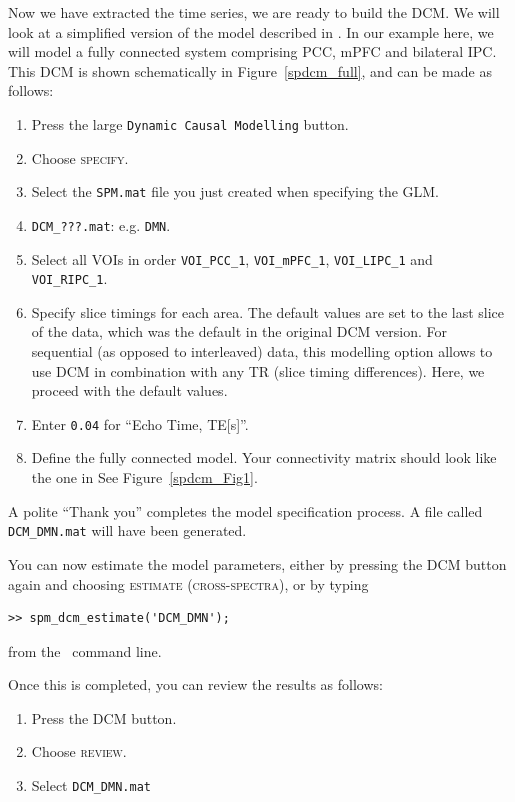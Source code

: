 Now we have extracted the time series, we are ready to build the DCM. We will look at a simplified version of the model described in \cite{rsDCM2015}.  In our example here, we will model a fully connected system comprising PCC, mPFC and bilateral IPC. This DCM is shown schematically in Figure~\ref{spdcm_full}, and can be made as follows:
\begin{enumerate}
 \item Press the large \texttt{Dynamic Causal Modelling} button.
 \item Choose \textsc{specify}.
 \item Select the \texttt{SPM.mat} file you just created when specifying the GLM.
 \item \texttt{DCM\_???.mat}: e.g. \texttt{DMN}.
 \item Select all VOIs in order \texttt{VOI\_PCC\_1}, \texttt{VOI\_mPFC\_1}, \texttt{VOI\_LIPC\_1} and  \texttt{VOI\_RIPC\_1}.
 \item Specify slice timings for each area. The default values are set to the last slice of the data, which was the default in the original DCM version. For sequential (as opposed to interleaved) data, this modelling option allows to use DCM in combination with any TR (slice timing differences). Here, we proceed with the default values.
\item Enter \texttt{0.04} for ``Echo Time, TE[s]''.
\item Define the fully connected model. Your connectivity matrix should look like the one in See Figure~\ref{spdcm_Fig1}.
\end{enumerate}
A polite ``Thank you'' completes the model specification process. A file called \texttt{DCM\_DMN.mat} will have been generated.

You can now estimate the model parameters, either by pressing the DCM button again and choosing \textsc{estimate (cross-spectra)}, or by typing
\begin{verbatim}
>> spm_dcm_estimate('DCM_DMN');
\end{verbatim}
from the \matlab\ command line.

Once this is completed, you can review the results as follows:
\begin{enumerate}
\item Press the DCM button.
\item Choose \textsc{review}.
\item Select \texttt{DCM\_DMN.mat}
\end{enumerate}

